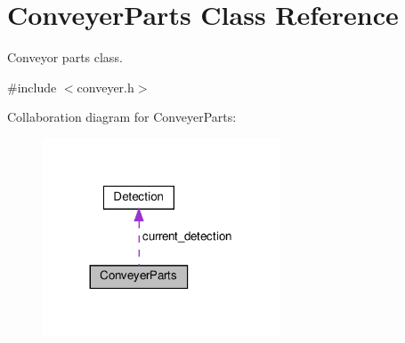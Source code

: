 \hypertarget{classConveyerParts}{}\section{Conveyer\+Parts Class Reference}
\label{classConveyerParts}


Conveyor parts class.  




{\ttfamily \#include $<$conveyer.\+h$>$}



Collaboration diagram for Conveyer\+Parts\+:\nopagebreak
\begin{figure}[H]
\begin{center}
\leavevmode
\includegraphics[width=200pt]{classConveyerParts__coll__graph}
\end{center}
\end{figure}
